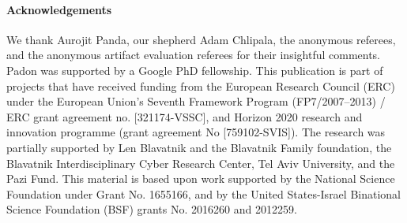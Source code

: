 \paragraph{Acknowledgements}
We thank Aurojit Panda, our shepherd Adam Chlipala,
the anonymous referees,
and the anonymous artifact evaluation referees
for their insightful comments.
%
Padon was supported by a Google PhD fellowship.
%
This publication is part of projects that have received funding from the European Research Council (ERC) under the European Union's 
Seventh Framework Program (FP7/2007--2013) / ERC grant agreement no. [321174-VSSC], and Horizon 2020 research and innovation programme (grant agreement No [759102-SVIS]).
%
The research was partially supported by
Len Blavatnik and the Blavatnik Family foundation, the Blavatnik Interdisciplinary Cyber Research Center, Tel Aviv University,
and the Pazi Fund. 
%
This material is based upon work supported by the National Science Foundation under Grant No. 1655166,
and by the United States-Israel Binational Science Foundation (BSF) grants No. 2016260 and 2012259.

%
%
%
